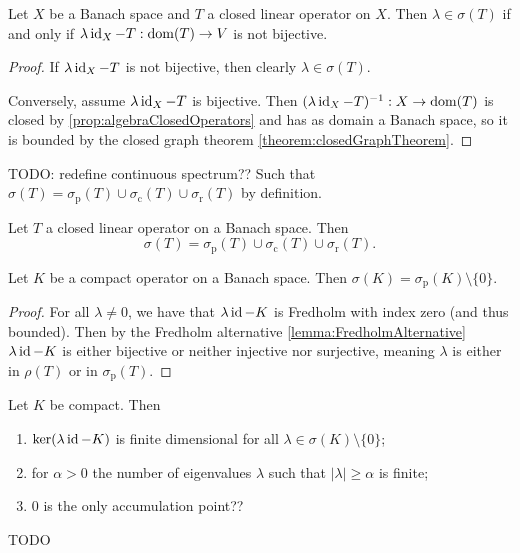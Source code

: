 \begin{proposition}
Let $X$ be a Banach space and $T$ a closed linear operator on $X$. Then $\lambda \in \sigma(T)$ \textup{if and only if} $\lambda \operatorname{id}_X - T: \operatorname{dom}(T) \to V$ is not bijective.
\end{proposition}
\begin{proof}
If $\lambda \operatorname{id}_X - T$ is not bijective, then clearly $\lambda \in \sigma(T)$.

Conversely, assume $\lambda \operatorname{id}_X - T$ is bijective. Then $(\lambda \operatorname{id}_X - T)^{-1}: X\to \operatorname{dom}(T)$ is closed by \ref{prop:algebraClosedOperators} and has as domain a Banach space, so it is bounded by the closed graph theorem \ref{theorem:closedGraphTheorem}.
\end{proof}
TODO: redefine continuous spectrum?? Such that $\sigma(T) = \sigma_\text{p}(T) \cup \sigma_\text{c}(T) \cup \sigma_\text{r}(T)$ by definition.
\begin{corollary}
Let $T$ a closed linear operator on a Banach space. Then
\[ \sigma(T) = \sigma_\text{p}(T) \cup \sigma_\text{c}(T) \cup \sigma_\text{r}(T). \]
\end{corollary}
\begin{corollary}
Let $K$ be a compact operator on a Banach space. Then $\sigma(K) = \sigma_\text{p}(K)\setminus\{0\}$.
\end{corollary}
\begin{proof}
For all $\lambda\neq 0$, we have that $\lambda\operatorname{id} - K$ is Fredholm with index zero (and thus bounded). Then by the Fredholm alternative \ref{lemma:FredholmAlternative} $\lambda\operatorname{id} - K$ is either bijective or neither injective nor surjective, meaning $\lambda$ is either in $\rho(T)$ or in $\sigma_\text{p}(T)$. 
\end{proof}

\begin{proposition} \label{prop:spectrumCompactOperator}
Let $K$ be compact. Then
\begin{enumerate}
\item $\ker(\lambda\operatorname{id}- K)$ is finite dimensional for all $\lambda\in\sigma(K)\setminus\{0\}$;
\item for $\alpha > 0$ the number of eigenvalues $\lambda$ such that $|\lambda|\geq \alpha$ is finite;
\item $0$ is the only accumulation point??
\end{enumerate}
TODO
\end{proposition}

